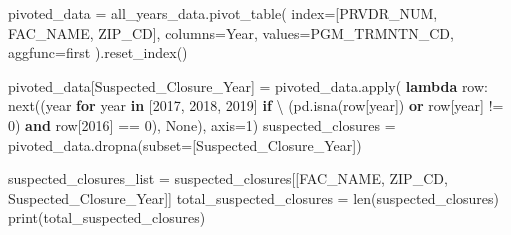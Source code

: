 \documentclass[
  letterpaper,
  DIV=11,
  numbers=noendperiod]{scrartcl}
\newenvironment{Shaded}{\begin{snugshade}}{\end{snugshade}}
\newcommand{\BuiltInTok}[1]{\textcolor[rgb]{0.00,0.23,0.31}{#1}}
\newcommand{\ControlFlowTok}[1]{\textcolor[rgb]{0.00,0.23,0.31}{\textbf{#1}}}
\newcommand{\DecValTok}[1]{\textcolor[rgb]{0.68,0.00,0.00}{#1}}
\newcommand{\KeywordTok}[1]{\textcolor[rgb]{0.00,0.23,0.31}{\textbf{#1}}}
\newcommand{\NormalTok}[1]{\textcolor[rgb]{0.00,0.23,0.31}{#1}}
\newcommand{\OperatorTok}[1]{\textcolor[rgb]{0.37,0.37,0.37}{#1}}
\newcommand{\StringTok}[1]{\textcolor[rgb]{0.13,0.47,0.30}{#1}}
\newcommand{\VariableTok}[1]{\textcolor[rgb]{0.07,0.07,0.07}{#1}}
\begin{document}
\begin{Shaded}
\begin{Highlighting}[]
\NormalTok{pivoted\_data }\OperatorTok{=}\NormalTok{ all\_years\_data.pivot\_table(}
\NormalTok{    index}\OperatorTok{=}\NormalTok{[}\StringTok{\textquotesingle{}PRVDR\_NUM\textquotesingle{}}\NormalTok{, }\StringTok{\textquotesingle{}FAC\_NAME\textquotesingle{}}\NormalTok{, }\StringTok{\textquotesingle{}ZIP\_CD\textquotesingle{}}\NormalTok{], }
\NormalTok{    columns}\OperatorTok{=}\StringTok{\textquotesingle{}Year\textquotesingle{}}\NormalTok{, }
\NormalTok{    values}\OperatorTok{=}\StringTok{\textquotesingle{}PGM\_TRMNTN\_CD\textquotesingle{}}\NormalTok{, }
\NormalTok{    aggfunc}\OperatorTok{=}\StringTok{\textquotesingle{}first\textquotesingle{}}
\NormalTok{).reset\_index()}
\end{Highlighting}
\end{Shaded}

\begin{Shaded}
\begin{Highlighting}[]
\NormalTok{pivoted\_data[}\StringTok{\textquotesingle{}Suspected\_Closure\_Year\textquotesingle{}}\NormalTok{] }\OperatorTok{=}\NormalTok{ pivoted\_data.}\BuiltInTok{apply}\NormalTok{(}
    \KeywordTok{lambda}\NormalTok{ row: }\BuiltInTok{next}\NormalTok{((year }\ControlFlowTok{for}\NormalTok{ year }\KeywordTok{in}\NormalTok{ [}\DecValTok{2017}\NormalTok{, }\DecValTok{2018}\NormalTok{, }\DecValTok{2019}\NormalTok{] }\ControlFlowTok{if} \OperatorTok{\textbackslash{}}
\NormalTok{        (pd.isna(row[year]) }\KeywordTok{or}\NormalTok{ row[year] }\OperatorTok{!=} \DecValTok{0}\NormalTok{) }\KeywordTok{and}\NormalTok{ row[}\DecValTok{2016}\NormalTok{] }\OperatorTok{==} \DecValTok{0}\NormalTok{), }\VariableTok{None}\NormalTok{), axis}\OperatorTok{=}\DecValTok{1}\NormalTok{)}
\NormalTok{suspected\_closures }\OperatorTok{=}\NormalTok{ pivoted\_data.dropna(subset}\OperatorTok{=}\NormalTok{[}\StringTok{\textquotesingle{}Suspected\_Closure\_Year\textquotesingle{}}\NormalTok{])}
\end{Highlighting}
\end{Shaded}

\begin{Shaded}
\begin{Highlighting}[]
\NormalTok{suspected\_closures\_list }\OperatorTok{=}\NormalTok{ suspected\_closures[[}\StringTok{\textquotesingle{}FAC\_NAME\textquotesingle{}}\NormalTok{, }\StringTok{\textquotesingle{}ZIP\_CD\textquotesingle{}}\NormalTok{, }\StringTok{\textquotesingle{}Suspected\_Closure\_Year\textquotesingle{}}\NormalTok{]]}
\NormalTok{total\_suspected\_closures }\OperatorTok{=} \BuiltInTok{len}\NormalTok{(suspected\_closures)}
\BuiltInTok{print}\NormalTok{(total\_suspected\_closures)}
\end{Highlighting}
\end{Shaded}
\end{document}
